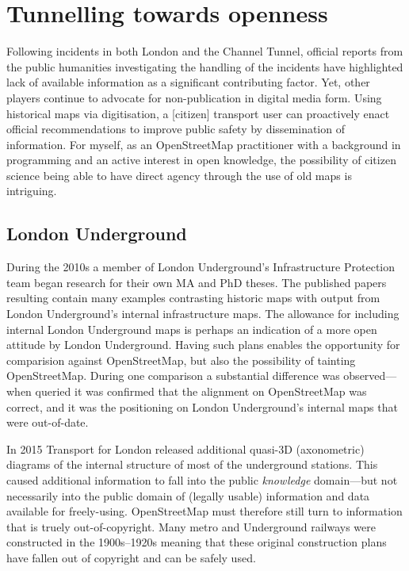 \documentclass[conference,a4paper]{IEEEtran}
\begin{document}
\section{Tunnelling towards openness}

Following incidents in both London and the Channel Tunnel, official
reports from the public humanities investigating the handling of the
incidents have highlighted lack of available information as a
significant contributing factor.\cite{riab-2010}\cite{riab-2013} Yet,
other players continue to advocate for non-publication in digital
media form.\cite{foi-2011} Using historical maps via digitisation, a
[citizen] transport user can proactively enact official
recommendations to improve public safety by dissemination of
information. For myself, as an OpenStreetMap
practitioner with a background in programming and an active interest
in open knowledge, the possibility of citizen science being able to
have direct agency through the use of old maps is intriguing.

\subsection{London Underground}

During the 2010s a member of London Underground's Infrastructure
Protection team began research for their own MA and PhD theses.  The
published papers resulting contain many examples contrasting historic
maps with output from London Underground's internal infrastructure
maps.\cite{darroch-2012}\cite{darroch-2014} The allowance for
including internal London Underground maps is perhaps an indication of a
more open attitude by London Underground.  Having such plans enables the opportunity for
comparision against OpenStreetMap, but also the possibility of
tainting OpenStreetMap.  During one comparison a substantial difference was observed---when queried it was confirmed that the
alignment on OpenStreetMap was correct, and it was the positioning
on London Underground's internal maps that were out-of-date.

In 2015 Transport for London released additional quasi-3D (axonometric) diagrams of
the internal structure of most of the underground stations.\cite{foi-2015}
This caused additional information to fall into the public {\it knowledge}
domain---but not necessarily into the public domain of (legally usable) information and
data available for freely-using.  OpenStreetMap must therefore still
turn to information that is truely out-of-copyright.  Many metro and
Underground railways were constructed in the 1900s--1920s meaning that
these original construction plans have fallen out of copyright and can be safely used.\\
\end{document}
